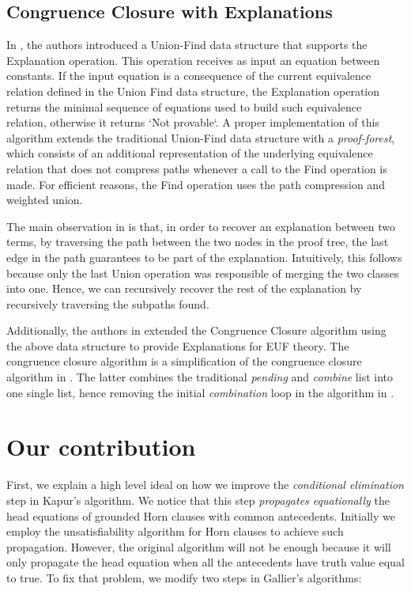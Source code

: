 \documentclass[10pt, sigconf,authordraft]{acmart}
\begin{document}
\subsection{Congruence Closure with Explanations}

In \cite{10.1007/978-3-540-32033-3_33}, the authors introduced a Union-Find
data structure that supports the Explanation operation. This operation receives
as input an equation between constants. If the input equation is a consequence
of the current equivalence relation defined in the Union Find data structure, the Explanation
operation returns the minimal sequence of equations used to build such equivalence relation,
otherwise it returns `Not provable`. A proper implementation of this algorithm extends the traditional
Union-Find data structure with a \emph{proof-forest}, which consists of an additional
representation of the underlying equivalence relation that does not compress
paths whenever a call to the Find operation is made. For efficient reasons, the Find operation
uses the path compression and weighted union.

The main observation in \cite{10.1007/978-3-540-32033-3_33} is that, in order to
recover an explanation between two terms, by traversing the path between the two nodes
in the proof tree, the last edge in the path guarantees to be part of the explanation.
Intuitively, this follows because only the last Union operation was responsible of merging
the two classes into one. Hence, we can recursively recover the rest of the
explanation by recursively traversing the subpaths found.

Additionally, the authors in \cite{10.1007/978-3-540-32033-3_33} extended the
Congruence Closure algorithm \cite{10.1007/978-3-540-39813-4_5} using the above
data structure to provide Explanations for EUF theory. The congruence closure algorithm
is a simplification of the congruence closure algorithm in \cite{10.1145/322217.322228}.
The latter combines the traditional \emph{pending} and \emph{combine} list into one
single list, hence removing the initial \emph{combination} loop in the algorithm in
\cite{10.1145/322217.322228}.

\section{Our contribution} \label{aha}

First, we explain a high level ideal on how we improve the \emph{conditional elimination}
step in Kapur's algorithm. We notice that this step \emph{propagates equationally} the
head equations of grounded Horn clauses with common antecedents. Initially we employ the
unsatisfiability algorithm for Horn clauses to achieve such propagation. However, the original
algorithm will not be enough because it will only propagate the head equation when all the
antecedents have truth value equal to true. To fix that problem, we modify two steps in Gallier's
algorithms:
\end{document}
